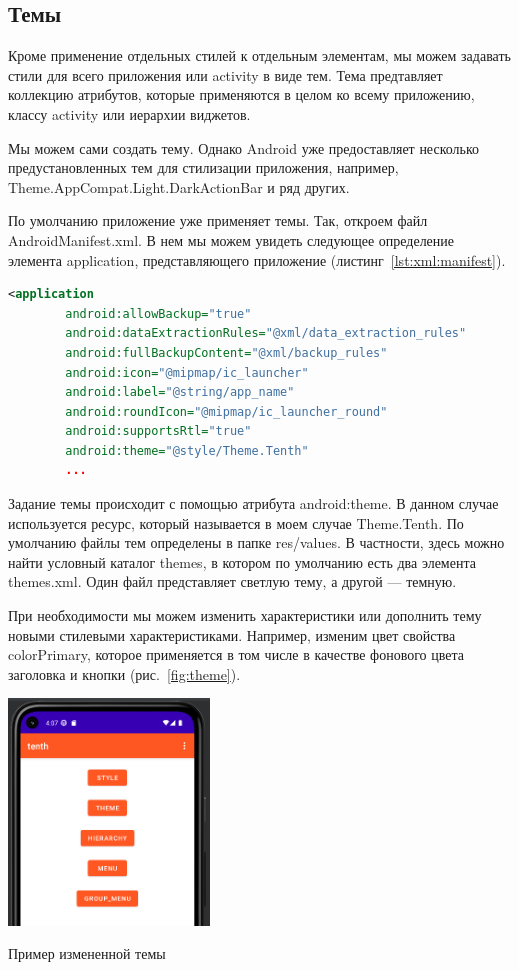 \subsection{Темы}
Кроме применение отдельных стилей к отдельным элементам, мы можем
задавать стили для всего приложения или activity в виде тем. Тема
предтавляет коллекцию атрибутов, которые применяются в целом ко всему
приложению, классу activity или иерархии виджетов.\par
Мы можем сами создать тему. Однако Android уже предоставляет несколько
предустановленных тем для стилизации приложения, например,
Theme.AppCompat.Light.DarkActionBar и ряд других.\par
По умолчанию приложение уже применяет темы. Так, откроем файл
AndroidManifest.xml. В нем мы можем увидеть следующее определение
элемента application, представляющего приложение
(листинг~\ref{lst:xml:manifest}).

\begin{lstlisting}[language=XML
	, label=lst:xml:manifest
	]
<application
        android:allowBackup="true"
        android:dataExtractionRules="@xml/data_extraction_rules"
        android:fullBackupContent="@xml/backup_rules"
        android:icon="@mipmap/ic_launcher"
        android:label="@string/app_name"
        android:roundIcon="@mipmap/ic_launcher_round"
        android:supportsRtl="true"
        android:theme="@style/Theme.Tenth"
        ...
\end{lstlisting}

Задание темы происходит с помощью атрибута android:theme. В данном
случае используется ресурс, который называется в моем случае
Theme.Tenth. По умолчанию файлы тем определены в папке res/values. В
частности, здесь можно найти условный каталог themes, в котором по
умолчанию есть два элемента themes.xml. Один файл представляет светлую тему,
а другой --- темную.\par
При необходимости мы можем изменить характеристики или дополнить
тему новыми стилевыми характеристиками. Например, изменим цвет
свойства colorPrimary, которое применяется в том числе в качестве фонового
цвета заголовка и кнопки (рис.~\ref{fig:theme}).

\begin{image}
	\includegraphics[width=0.4\textwidth]{Screenshot from 2023-04-27 16-08-05}
	\caption{Пример измененной темы}
	\label{fig:theme}
\end{image}

